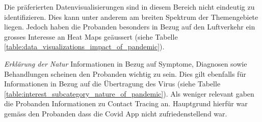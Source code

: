 Die präferierten Datenvisualisierungen sind in diesem Bereich nicht eindeutig zu identifizieren. Dies kann unter anderem am breiten Spektrum der Themengebiete liegen. Jedoch haben die Probanden besonders in Bezug auf den Luftverkehr ein grosses Interesse an Heat Maps geäussert (siehe Tabelle \ref{table:data_visualizations_impact_of_pandemic}).

\begin{table}[h]
\centering
{}
\caption{Ausgewählte Datenvisualisierungen pro Anwendungsfall für den Bereich ``Einfluss der Pandemie`` (Eigene Darstellung)}
\label{table:data_visualizations_impact_of_pandemic}
\end{table}

\clearpage
\noindent
\textit{Erklärung der Natur}
\newline
\indent
Informationen in Bezug auf Symptome, Diagnosen sowie Behandlungen scheinen den Probanden wichtig zu sein. Dies gilt ebenfalls für Informationen in Bezug auf die Übertragung des Virus (siehe Tabelle \ref{table:interest_subcategory_nature_of_pandemic}).  Als weniger relevant gaben die Probanden Informationen zu Contact Tracing an. Hauptgrund hierfür war gemäss den Probanden dass die Covid App nicht zufriedenstellend war.

